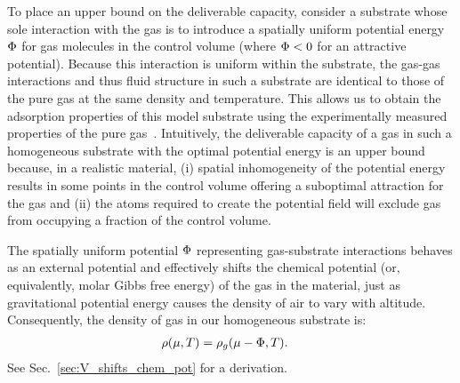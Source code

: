 To place an upper bound on the deliverable capacity, consider a substrate whose sole interaction with the gas is to introduce a spatially uniform potential energy $\Phi$
for gas molecules in the control volume (where $\Phi<0$ for an attractive potential). Because this interaction is uniform within the substrate, the gas-gas interactions and thus fluid structure in such a substrate are identical to those of the pure gas at the same density and temperature. This allows us to obtain the adsorption properties of this model substrate using the experimentally measured properties of the pure gas~\cite{nist}. 
Intuitively, the deliverable capacity of a gas in such a homogeneous substrate with the optimal potential energy is an upper bound because, in a realistic material, (i) spatial inhomogeneity of the potential energy results in some points in the control volume offering a suboptimal attraction for the gas and (ii) the atoms required to create the potential field will exclude gas from occupying a fraction of the control volume.

The spatially uniform potential $\Phi$ representing gas-substrate interactions behaves as an external potential and effectively shifts the chemical potential (or, equivalently, molar Gibbs free energy) of the gas in the material, just as gravitational potential energy causes the density of air to vary with altitude.  Consequently, the density of gas in our homogeneous substrate is:
\begin{align}
    \rho(\mu,T) &= \rho_g(\mu - \Phi,T). \label{eq:mof-density}
\end{align}
See Sec.~\ref{sec:V_shifts_chem_pot} for a derivation.

